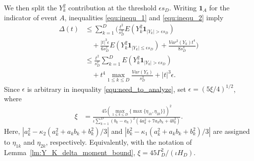 We then split the $Y_k^2$ contribution at the threshold $\epsilon s_D$. Writing $\mathbf{1}_{A}$ for the indicator of event $A$, inequalities \ref{equ:inequ_1} and \ref{equ:inequ_2} imply
\begin{equation}
\begin{aligned}
\Delta(t)
&\leq \sum_{k=1}^{D}\Bigg(
\frac{t^2}{s_D^2}E(Y_k^2\mathbf{1}_{|Y_k|>\epsilon s_D})\\
&\quad +\frac{|t|^3\epsilon}{6s_D^2}
E(Y_k^2\mathbf{1}_{|Y_k|\leq\epsilon s_D})
+\frac{Var^2(Y_k)t^4}{8s_D^4}\Bigg)\\
&\leq
\frac{t^2}{s_D^2}
\sum_{k=1}^{D}E(Y_k^2\mathbf{1}_{|Y_k|>\epsilon s_D})\\
&\quad +t^4\max_{1\leq k\leq D}\frac{Var(Y_k)}{s_D^2}
+|t|^3\epsilon .
\end{aligned}
\label{equ:need_to_analyze}
\end{equation}
Since $\epsilon$ is arbitrary in inequality \ref{equ:need_to_analyze}, set $\epsilon=(5\xi/4)^{1/2}$, where
\begin{equation}
\begin{aligned}
\xi
&=
\frac{45\left(\max_{1\leq k\leq D}
\{\max\{\eta_{1k},\eta_{2k}\}\}\right)^2}
{\iota\sum_{k=1}^{D}(b_k-a_k)^2
(4a_k^2+7a_kb_k+4b_k^2)} .
\end{aligned}
\label{equ:xi}
\end{equation}
Here, $|a^2_k-\kappa_2(a^2_k+a_kb_k+b^2_k)/3|$ and $|b^2_k-\kappa_1(a^2_k+a_kb_k+b^2_k)/3|$ are assigned to $\eta_{1k}$ and $\eta_{2k}$, respectively. Equivalently, with the notation of Lemma~\ref{lm:Y_K_delta_moment_bound}, $\xi=45\Gamma_D^2/(\iota H_D)$.

